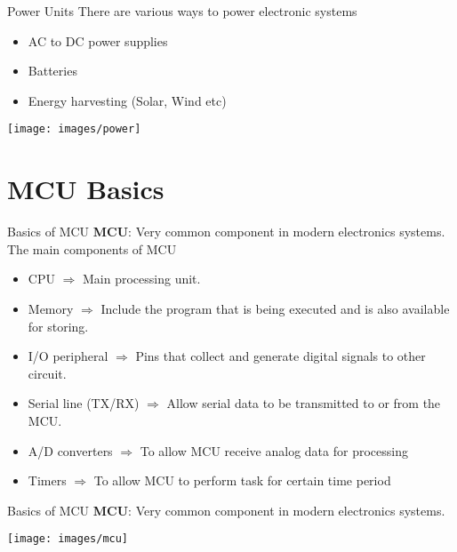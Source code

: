 \documentclass{beamer}
\begin{document}
\begin{darkframes}
\begin{frame}[<+->]{Power Units}
	There are various ways to power electronic systems
	\begin{itemize}
		\item AC to DC power supplies
		\item Batteries
		\item Energy harvesting (Solar, Wind etc)
	\end{itemize}
\begin{center}
	\texttt{[image: images/power]} 
\end{center}
\end{frame}


\section {MCU Basics}
\begin{frame}[<+->]{Basics of MCU}
	\textbf{MCU}: Very common component in modern electronics systems.\\
	
	The main components of MCU

	\begin{itemize}
		\item CPU $\Rightarrow$ Main processing unit.
		\item Memory  $\Rightarrow$ Include the program that is being executed and is also available for storing.
		\item I/O peripheral  $\Rightarrow$ Pins that collect and generate digital signals to other circuit.
		\item Serial line (TX/RX)  $\Rightarrow$ Allow serial data to be transmitted to or from the MCU.
		\item A/D converters $\Rightarrow$ To allow MCU receive analog data for processing
		\item Timers $\Rightarrow$ To allow MCU to perform task for certain time period
	\end{itemize}
\end{frame}    

\begin{frame}[<+->]{Basics of MCU}
	\textbf{MCU}: Very common component in modern electronics systems.
	\begin{center}
		\texttt{[image: images/mcu]} 
	\end{center}
\end{frame}    


\end{darkframes}
\end{document}
